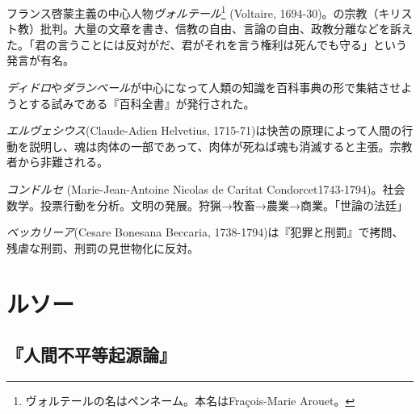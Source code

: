 \documentclass[uplatex,dvipdfmx]{jsarticle} \usepackage{mystyle}%
\begin{document}
フランス啓蒙主義の中心人物\emph{ヴォルテール}\footnote{ヴォルテールの名はペンネーム。本名はFra\c{c}ois-Marie Arouet。} (Voltaire, 1694-30)。の宗教（キリスト教）批判。大量の文章を書き、信教の自由、言論の自由、政教分離などを訴えた。「君の言うことには反対がだ、君がそれを言う権利は死んでも守る」という発言が有名。


\emph{ディドロ}や\emph{ダランベール}が中心になって人類の知識を百科事典の形で集結させようとする試みである『百科全書』が発行された。


\emph{エルヴェシウス}(Claude-Adien Helvetius, 1715-71)は快苦の原理によって人間の行動を説明し、魂は肉体の一部であって、肉体が死ねば魂も消滅すると主張。宗教者から非難される。

\emph{コンドルセ} (Marie-Jean-Antoine Nicolas de Caritat Condorcet1743-1794)。社会数学。投票行動を分析。文明の発展。狩猟→牧畜→農業→商業。「世論の法廷」



\nocite{hunt07:_inven_human_right}




 \emph{ベッカリーア}(Cesare Bonesana Beccaria, 1738-1794)は『犯罪と刑罰』で拷問、残虐な刑罰、刑罰の見世物化に反対。









\section{ルソー}


\subsection{『人間不平等起源論』}
\end{document}
